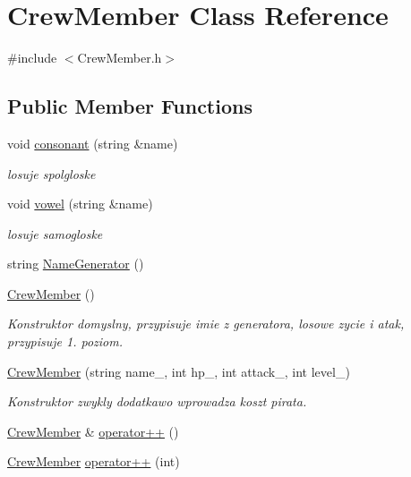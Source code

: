 \hypertarget{class_crew_member}{}\section{Crew\+Member Class Reference}
\label{class_crew_member}


{\ttfamily \#include $<$Crew\+Member.\+h$>$}

\subsection*{Public Member Functions}
\begin{DoxyCompactItemize}
\item 
void \hyperlink{class_crew_member_a822fee67c0e8a9416bc208824d966961}{consonant} (string \&name)
\begin{DoxyCompactList}\small\item\em losuje spolgloske \end{DoxyCompactList}\item 
void \hyperlink{class_crew_member_a9cef5974e00cdd38adfa6c472f551605}{vowel} (string \&name)
\begin{DoxyCompactList}\small\item\em losuje samogloske \end{DoxyCompactList}\item 
string \hyperlink{class_crew_member_a3b22e0361d970a65120f4f83be61a506}{Name\+Generator} ()
\item 
\hyperlink{class_crew_member_aa37f9cc1bc79a2661fa6cc61b148fb87}{Crew\+Member} ()
\begin{DoxyCompactList}\small\item\em Konstruktor domyslny, przypisuje imie z generatora, losowe zycie i atak, przypisuje 1. poziom. \end{DoxyCompactList}\item 
\hyperlink{class_crew_member_a93f235bcda7aabc4e97673e446fc17ea}{Crew\+Member} (string name\+\_\+, int hp\+\_\+, int attack\+\_\+, int level\+\_\+)
\begin{DoxyCompactList}\small\item\em Konstruktor zwykly dodatkawo wprowadza koszt pirata. \end{DoxyCompactList}\item 
\hyperlink{class_crew_member}{Crew\+Member} \& \hyperlink{class_crew_member_a6421e136cb395d24d3b7bcff7445decf}{operator++} ()
\item 
\hyperlink{class_crew_member}{Crew\+Member} \hyperlink{class_crew_member_a28fa041c3e2e9407dcfefb0a3c072c66}{operator++} (int)

\end{DoxyCompactItemize}
